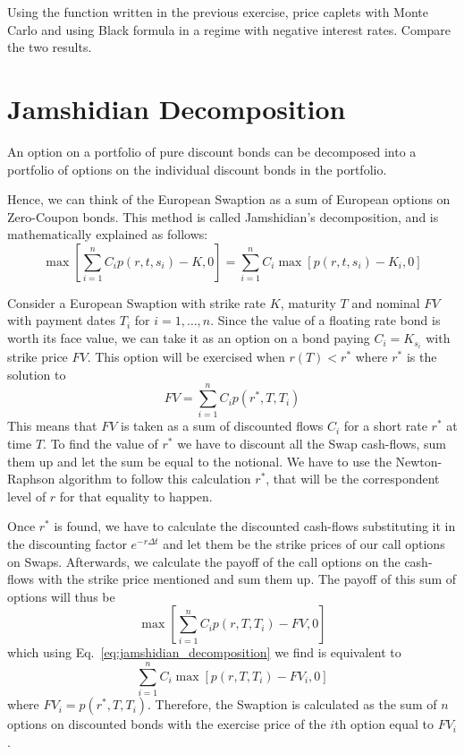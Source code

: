 \documentclass[12pt,a4paper]{article}
\begin{document}
\begin{question}
Using the function written in the previous exercise, price caplets with Monte Carlo and using Black formula in a regime with negative interest rates. Compare the two results.
\end{question}

\clearpage
\section{Jamshidian Decomposition}
An option on a portfolio of pure discount bonds can be decomposed into a portfolio of options on the individual discount bonds in the portfolio.

Hence, we can think of the European Swaption as a sum of European
options on Zero-Coupon bonds. This method is called Jamshidian’s decomposition, and is mathematically explained as follows:
\begin{equation}
	\max\left[\sum_{i=1}^n C_i p(r, t, s_i) - K, 0\right] = \sum_{i=1}^n C_i \max\left[p(r, t, s_i) - K_i, 0\right]
	\label{eq:jamshidian_decomposition}
\end{equation}

Consider a European Swaption with strike rate $K$, maturity $T$ and nominal $FV$
with payment dates $T_i$ for $i = 1,\ldots, n$. Since the value of a floating rate bond is worth its face value, we can take it as an option on a bond paying $C_i = K_{s_i}$ with strike price $FV$. This option will be exercised when $r(T) < r^*$ where $r^*$ is the solution to
\begin{equation}
	FV = \sum_{i=1}^n C_i p(r^*, T, T_i)
\end{equation}
This means that $FV$ is taken as a sum of discounted flows $C_i$ for a short rate $r^*$ at time $T$. To find the value of $r^*$ we have to discount all the Swap cash-flows, sum them up and let the sum be equal to the notional. We have to use the Newton-Raphson algorithm to follow this calculation $r^*$, that will be the correspondent level of $r$ for that equality to happen. 

Once $r^*$ is found, we have to calculate the discounted cash-flows substituting it in the discounting factor $e^{-r\Delta t}$ and let them be the strike prices of our call options on Swaps.
Afterwards, we calculate the payoff of the call options on the cash-flows with
the strike price mentioned and sum them up. The payoff of this sum of options
will thus be
\begin{equation}
	\max\left[\sum_{i=1}^n C_ip(r, T, T_i)-FV, 0\right]
\end{equation}
which using Eq.~\ref{eq:jamshidian_decomposition} we find is equivalent to
\begin{equation}
	\sum_{i=1}^n C_i \max\left[p(r, T, T_i)-FV_i, 0\right]
\end{equation}
where $FV_i = p(r^*, T, T_i)$. 
Therefore, the Swaption is calculated as the sum of $n$ options on discounted bonds with the exercise price of the $i$th option equal to $FV_i$.
\end{document}
